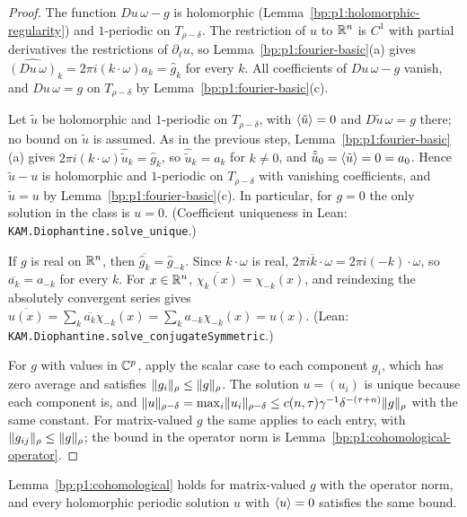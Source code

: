 \begin{proof}
\label{step:p1:coh-equation}
The function $Du\,\omega-g$ is holomorphic (Lemma~\ref{bp:p1:holomorphic-regularity}) and $1$-periodic on
$T_{\rho-\delta}$. The restriction of $u$ to $\mathbb{R}^n$ is $C^1$ with partial derivatives the restrictions of
$\partial_\ell u$, so Lemma~\ref{bp:p1:fourier-basic}(a) gives
$\widehat{(Du\,\omega)}_k=2\pi i(k\cdot\omega)a_k=\hat g_k$ for every $k$. All coefficients of
$Du\,\omega-g$ vanish, and $Du\,\omega=g$ on $T_{\rho-\delta}$ by Lemma~\ref{bp:p1:fourier-basic}(c).

\label{step:p1:coh-unique}
Let $\tilde u$ be holomorphic and $1$-periodic on $T_{\rho-\delta}$, with $\langle \tilde u\rangle=0$ and
$D\tilde u\,\omega=g$ there; no bound on $\tilde u$ is assumed. As in the previous step,
Lemma~\ref{bp:p1:fourier-basic}(a) gives $2\pi i(k\cdot\omega)\hat{\tilde u}_k=\hat g_k$, so
$\hat{\tilde u}_k=a_k$ for $k\ne0$, and $\hat{\tilde u}_0=\langle \tilde u\rangle=0=a_0$. Hence $\tilde u-u$ is
holomorphic and $1$-periodic on $T_{\rho-\delta}$ with vanishing coefficients, and $\tilde u=u$ by
Lemma~\ref{bp:p1:fourier-basic}(c). In particular, for $g=0$ the only solution in the class is $u=0$.
(Coefficient uniqueness in Lean: \nolinkurl{KAM.Diophantine.solve_unique}.)

\label{step:p1:coh-real}
If $g$ is real on $\mathbb{R}^n$, then $\overline{\hat g_k}=\hat g_{-k}$. Since $k\cdot\omega$ is real,
$\overline{2\pi ik\cdot\omega}=2\pi i(-k)\cdot\omega$, so $\overline{a_k}=a_{-k}$ for every $k$. For
$x\in\mathbb{R}^n$, $\overline{\chi_k(x)}=\chi_{-k}(x)$, and reindexing the absolutely convergent series gives
$\overline{u(x)}=\sum_k\overline{a_k}\chi_{-k}(x)=\sum_ka_{-k}\chi_{-k}(x)=u(x)$. (Lean:
\nolinkurl{KAM.Diophantine.solve_conjugateSymmetric}.)

\label{step:p1:coh-vector}
For $g$ with values in $\mathbb{C}^p$, apply the scalar case to each component $g_i$, which has zero average and
satisfies $\lVert g_i\rVert_\rho\le\lVert g\rVert_\rho$. The solution $u=(u_i)$ is unique because each component is,
and $\lVert u\rVert_{\rho-\delta}=\max_i\lVert u_i\rVert_{\rho-\delta}\le c(n,\tau)\gamma^{-1}\delta^{-(\tau+n)}\lVert g\rVert_\rho$
with the same constant. For matrix-valued $g$ the same applies to each entry, with
$\lVert g_{ij}\rVert_\rho\le\lVert g\rVert_\rho$; the bound in the operator norm is
Lemma~\ref{bp:p1:cohomological-operator}.
\end{proof}

\begin{lemma}\label{bp:p1:cohomological-operator}
Lemma~\ref{bp:p1:cohomological} holds for matrix-valued $g$ with the operator norm, and every holomorphic periodic
solution $u$ with $\langle u\rangle=0$ satisfies the same bound.
\end{lemma}

